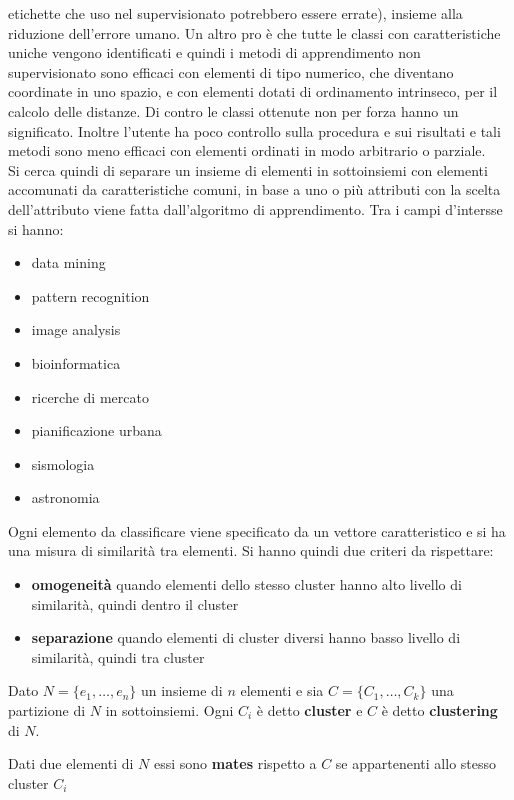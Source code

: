 etichette che uso nel supervisionato potrebbero essere errate), insieme
alla riduzione dell'errore umano. Un altro pro è che tutte le classi con
caratteristiche uniche vengono identificati e quindi i metodi di apprendimento
non supervisionato sono efficaci con elementi di tipo numerico, che diventano
coordinate in uno spazio, e con elementi dotati di ordinamento intrinseco, per
il calcolo delle distanze. Di contro le classi ottenute non per forza hanno un
significato. Inoltre l'utente ha poco controllo sulla procedura e sui risultati
e tali metodi sono meno efficaci con elementi ordinati in modo arbitrario o
parziale. \\
Si cerca quindi di separare un insieme di elementi in sottoinsiemi con elementi
accomunati da caratteristiche comuni, in base a uno o più attributi con la
scelta dell'attributo viene fatta dall'algoritmo di apprendimento. Tra i campi
d'intersse si hanno:
\begin{itemize}
  \item data mining
  \item pattern recognition
  \item image analysis 
  \item bioinformatica 
  \item ricerche di mercato
  \item pianificazione urbana 
  \item sismologia 
  \item astronomia
\end{itemize}
Ogni elemento da classificare viene specificato da un vettore caratteristico e
si ha una misura di similarità tra elementi. Si hanno quindi due criteri da 
rispettare:
\begin{itemize}
  \item \textbf{omogeneità} quando elementi dello stesso cluster hanno alto
  livello di similarità, quindi dentro il cluster
  \item \textbf{separazione} quando elementi di cluster diversi hanno basso
  livello di similarità, quindi tra cluster
\end{itemize}
\begin{definizione}
  Dato $N=\{e_1,\ldots, e_n\}$ un insieme di $n$ elementi e sia
  $C=\{C_1,\ldots, C_k\}$ una partizione di $N$ in sottoinsiemi. Ogni $C_i$ è
  detto \textbf{cluster} e $C$ è detto \textbf{clustering} di $N$.
\end{definizione}
\begin{definizione}
  Dati due elementi di $N$ essi sono \textbf{mates} rispetto a $C$ se
  appartenenti allo stesso cluster $C_i$
\end{definizione}

